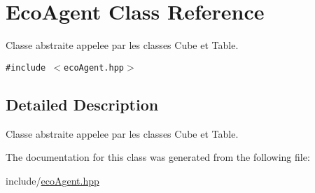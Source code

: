 \hypertarget{classEcoAgent}{
\section{EcoAgent Class Reference}
\label{classEcoAgent}
}
Classe abstraite appelee par les classes Cube et Table.  


{\tt \#include $<$ecoAgent.hpp$>$}



\subsection{Detailed Description}
Classe abstraite appelee par les classes Cube et Table. 

The documentation for this class was generated from the following file:\begin{CompactItemize}
\item 
include/\hyperlink{ecoAgent_8hpp}{ecoAgent.hpp}\end{CompactItemize}
